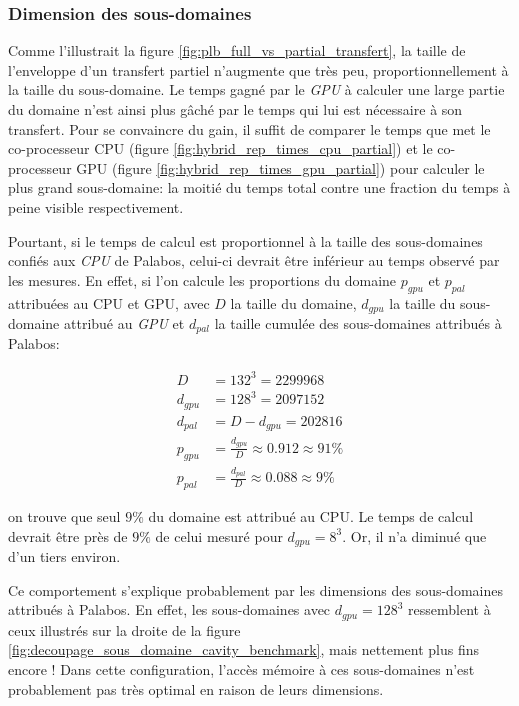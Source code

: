 \subsubsection{Dimension des sous-domaines} \label{title-mesure_hybride_dim_sous_dom}
Comme l'illustrait la figure \ref{fig:plb_full_vs_partial_transfert}, la taille de l'enveloppe d'un transfert partiel n'augmente que très peu, proportionnellement à la taille du sous-domaine. Le temps gagné par le \textit{GPU} à calculer une large partie du domaine n'est ainsi plus gâché par le temps qui lui est nécessaire à son transfert. Pour se convaincre du gain, il suffit de comparer le temps que met le co-processeur \acs{CPU} (figure \ref{fig:hybrid_rep_times_cpu_partial}) et le co-processeur \acs{GPU} (figure \ref{fig:hybrid_rep_times_gpu_partial}) pour calculer le plus grand sous-domaine: la moitié du temps total contre une fraction du temps à peine visible respectivement.

Pourtant, si le temps de calcul est proportionnel à la taille des sous-domaines confiés aux \textit{CPU} de Palabos, celui-ci devrait être inférieur au temps observé par les mesures. En effet, si l’on calcule les proportions du domaine $p_{gpu}$ et $p_{pal}$ attribuées au \acs{CPU} et \acs{GPU}, avec $D$ la taille du  domaine, $d_{gpu}$ la taille du sous-domaine attribué au \textit{GPU} et $d_{pal}$ la taille cumulée des sous-domaines attribués à Palabos:

\begin{align}
D &= 132^3 = 2299968\\
d_{gpu} &=128^3 = 2097152\\
d_{pal} &= D - d_{gpu} = 202816\\
p_{gpu} &= \frac{d_{gpu}}{D} \approx 0.912 \approx 91\% \\
p_{pal} &= \frac{d_{pal}}{D} \approx 0.088  \approx 9 \%
\end{align}

on trouve que seul $9\%$ du domaine est attribué au \acs{CPU}. Le temps de calcul devrait être près de $9\%$ de celui mesuré pour $d_{gpu}=8^3$. Or, il n'a diminué que d'un tiers environ. 

Ce comportement s'explique probablement par les dimensions des sous-domaines attribués à Palabos. En effet, les sous-domaines avec $d_{gpu}=128^3$ ressemblent à ceux illustrés sur la droite de la figure \ref{fig:decoupage_sous_domaine_cavity_benchmark}, mais nettement plus fins encore ! Dans cette configuration, l'accès mémoire à ces sous-domaines n'est probablement pas très optimal en raison de leurs dimensions. 

